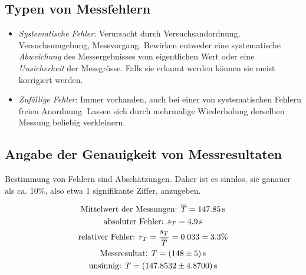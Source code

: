\subsection{Typen von Messfehlern}

\begin{itemize}
    \item
        \emph{Systematische   Fehler}: Verursacht  durch   Versuchsandordnung,
        Versuchsumgebung,  Messvorgang. Bewirken  entweder eine  systematische
        \emph{Abweichung}  des  Messergebnisses  vom  eigentlichen  Wert  oder
        eine  \emph{Unsicherheit} der  Messgr\"osse. Falls sie  erkannt werden
        k\"onnen sie meist korrigiert werden.
    \item
        \emph{Zuf\"allige  Fehler}: Immer   vorhanden,  auch  bei   einer  von
        systematischen Fehlern freien  Anordnung. Lassen sich durch mehrmalige
        Wiederholung derselben Messung beliebig verkleinern.
\end{itemize}


\subsection{Angabe der Genauigkeit von Messresultaten}

Bestimmung von Fehlern sind Absch\"atzungen. Daher ist es sinnlos, sie ganauer
als ca. 10\%, also etwa 1 signifikante Ziffer, anzugeben.

\begin{gather}
    \text{Mittelwert der Messungen: }\overline{T} = \SI{147.85}{\second} \\
    \text{absoluter Fehler: }                 s_T = \SI{4.9}{\second} \\
    \text{relativer Fehler: }                 r_T = \frac{s_T}{\overline{T}} = \num{0.033} = 3.3\% \\
    \text{Messresultat: }                       T = \SI[separate-uncertainty = true]{148 +- 5}{\second} \\
    \text{unsinnig: }                           T = \SI[separate-uncertainty = true]{147.8532 +- 4.87}{\second}
\end{gather}

